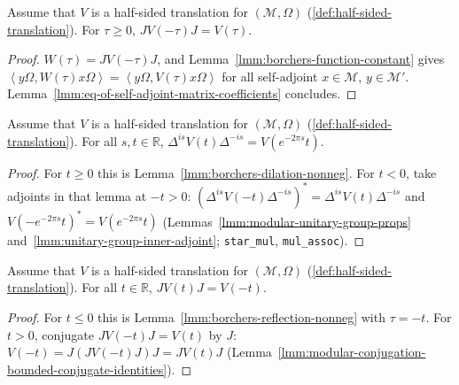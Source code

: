\begin{lemma}
    \label{lmm:borchers-reflection-nonneg}
    \leanok
    Assume that $V$ is a half-sided translation for $(\mathcal{M}, \Omega)$ (\ref{def:half-sided-translation}). For $\tau \ge 0$, $JV(-\tau)J = V(\tau)$.
\end{lemma}
\begin{proof}
    \leanok
    $W(\tau) = JV(-\tau)J$, and Lemma~\ref{lmm:borchers-function-constant} gives $\left< y\Omega, W(\tau)x\Omega \right> = \left< y\Omega, V(\tau)x\Omega \right>$ for all self-adjoint $x \in \mathcal{M}$, $y \in \mathcal{M}'$. Lemma~\ref{lmm:eq-of-self-adjoint-matrix-coefficients} concludes.
\end{proof}

\begin{lemma}
    \label{lmm:borchers-dilation-all}
    \leanok
    Assume that $V$ is a half-sided translation for $(\mathcal{M}, \Omega)$ (\ref{def:half-sided-translation}). For all $s, t \in \mathbb{R}$, $\Delta^{is}V(t)\Delta^{-is} = V(e^{-2\pi s}t)$.
\end{lemma}
\begin{proof}
    \leanok
    For $t \ge 0$ this is Lemma~\ref{lmm:borchers-dilation-nonneg}. For $t < 0$, take adjoints in that lemma at $-t > 0$: $(\Delta^{is}V(-t)\Delta^{-is})^* = \Delta^{is}V(t)\Delta^{-is}$ and $V(-e^{-2\pi s}t)^* = V(e^{-2\pi s}t)$ (Lemmas~\ref{lmm:modular-unitary-group-props} and~\ref{lmm:unitary-group-inner-adjoint}; \texttt{star\_mul}, \texttt{mul\_assoc}).
\end{proof}

\begin{lemma}
    \label{lmm:borchers-reflection-all}
    \leanok
    Assume that $V$ is a half-sided translation for $(\mathcal{M}, \Omega)$ (\ref{def:half-sided-translation}). For all $t \in \mathbb{R}$, $JV(t)J = V(-t)$.
\end{lemma}
\begin{proof}
    \leanok
    For $t \le 0$ this is Lemma~\ref{lmm:borchers-reflection-nonneg} with $\tau = -t$. For $t > 0$, conjugate $JV(-t)J = V(t)$ by $J$: $V(-t) = J(JV(-t)J)J = JV(t)J$ (Lemma~\ref{lmm:modular-conjugation-bounded-conjugate-identities}).
\end{proof}

